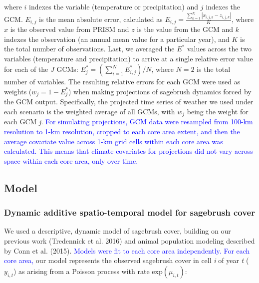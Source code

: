 \documentclass[
  12pt,
]{article}
\begin{document}
\noindent{}where \(i\) indexes the variable (temperature or precipitation) and \(j\) indexes the GCM.
\(E_{i,j}\) is the mean absolute error, calculated as \(E_{i,j} = \frac{\sum_{k=1}^K|x_{i,j,k} - z_{i,j,k}|}{K}\), where \(x\) is the observed value from PRISM and \(z\) is the value from the GCM and \(k\) indexes the observation (an annual mean value for a particular year), and \(K\) is the total number of observations.
Last, we averaged the \(E^*\) values across the two variables (temperature and precipitation) to arrive at a single relative error value for each of the \(J\) GCMs: \(E_{j}^* = \left(\sum_{i=1}^N E_{i,j}^* \right) / N\), where \(N = 2\) is the total number of variables.
The resulting relative errors for each GCM were used as weights (\(w_j = 1 - E_j^*\)) when making projections of sagebrush dynamics forced by the GCM output.
Specifically, the projected time series of weather we used under each scenario is the weighted average of all GCMs, with \(w_j\) being the weight for each GCM \emph{j}.
\textcolor{blue}{For simulating projections, GCM data were resampled from 100-km resolution to 1-km resolution, cropped to each core area extent, and then the average covariate value across 1-km grid cells within each core area was calculated.}
\textcolor{blue}{This means that climate covariates for projections did not vary across space within each core area, only over time.}

\hypertarget{model}{%
\subsection{Model}\label{model}}

\hypertarget{dynamic-additive-spatio-temporal-model-for-sagebrush-cover}{%
\subsubsection{Dynamic additive spatio-temporal model for sagebrush cover}\label{dynamic-additive-spatio-temporal-model-for-sagebrush-cover}}

We used a descriptive, dynamic model of sagebrush cover, building on our previous work (Tredennick et al. 2016) and animal population modeling described by Conn et al. (2015).
\textcolor{blue}{Models were fit to each core area independently.}
\textcolor{blue}{For each core area,} our model represents the observed sagebrush cover in cell \emph{i} of year \emph{t} (\(y_{i,t}\)) as arising from a Poisson process with rate \(\text{exp}(\mu_{i,t})\):
\end{document}
